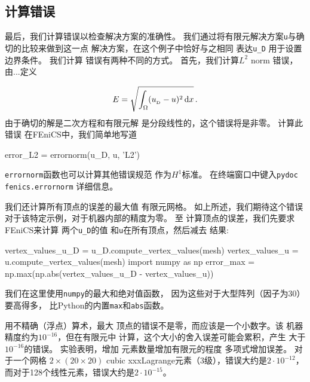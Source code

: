 
\subsection{计算错误}


最后，我们计算错误以检查解决方案的准确性。
我们通过将有限元解决方案\texttt{u}与确切的比较来做到这一点
解决方案，在这个例子中恰好与之相同
表达\verb!u_D! 用于设置边界条件。 我们计算
错误有两种不同的方式。 首先，我们计算$L^2$ norm
错误，由...定义

\[ E = \sqrt{\int_\Omega (\ub - u)^2\dx}\tp\]
由于确切的解是二次方程和有限元解
是分段线性的，这个错误将是非零。 计算此错误
在FEniCS中，我们简单地写道

\begin{python}
error_L2 = errornorm(u_D, u, 'L2')
\end{python}
\texttt{errornorm}函数也可以计算其他错误规范
作为$H^1$标准。 在终端窗口中键入\texttt{pydoc fenics.errornorm}
详细信息。

我们还计算所有顶点的误差的最大值
有限元网格。 如上所述，我们期待这个错误
对于该特定示例，对于机器内部的精度为零。 至
计算顶点的误差，我们先要求FEniCS来计算
两个\verb!u_D!的值 和\texttt{u}在所有顶点，然后减去
结果:

\begin{python}
vertex_values_u_D = u_D.compute_vertex_values(mesh)
vertex_values_u = u.compute_vertex_values(mesh)
import numpy as np
error_max = np.max(np.abs(vertex_values_u_D - vertex_values_u))
\end{python}
我们在这里使用\texttt{numpy}的最大和绝对值函数，
因为这些对于大型阵列（因子为30）要高得多，
比Python的内置\texttt{max}和\texttt{abs}函数。

\begin{notice}[如何检查错误消失]
用不精确（浮点）算术，最大
顶点的错误不是零，而应该是一个小数字。该
机器精度约为$10^{-16}$，但在有限元中
计算，这个大小的舍入误差可能会累积，产生
大于$10^{-16}$的错误。 实验表明，增加
元素数量增加有限元的程度
多项式增加误差。 对于一个网格
$2\times(20\times20)$ cubic xxxLagrange元素（3级），错误大约是$2\cdot
10^{-12}$，而对于128个线性元素，错误大约是$2\cdot
10^{-15}$。
\end{notice}

